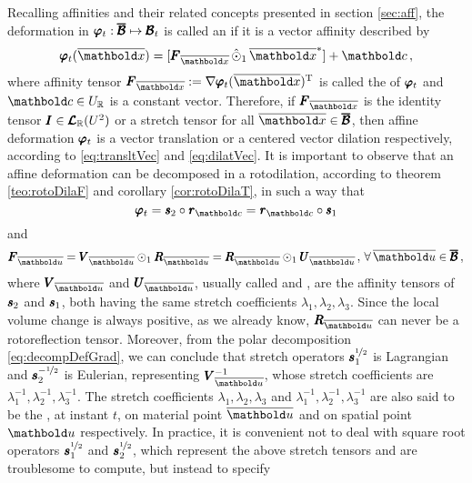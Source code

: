 Recalling affinities and their related concepts presented in section \ref{sec:aff}, the deformation in $\pmb{\varphi}_t : \pmb{\overline{\mathcal{B}}} \mapsto \pmb{\mathcal{B}}_t$ is called an  if it is a vector affinity described by 
\begin{equation}
\fua{\tnr{\varphi}_t}{\overline{\vto{x}}} =[\tnr{F}_{\overline{\vto{x}}}\,\hat{\odot}_1\,\overline{\vto{x}}^*] + \vto{c}\,, 
\end{equation}
where affinity tensor $\tnr{F}_{\overline{\vto{x}}}:=\fua{\nabla\tnr{\varphi}_t}{\overline{\vto{x}}}^\text{T}$ is called the  of $\pmb{\varphi}_t$ and $\vto{c}\in U_\real$ is a constant vector. Therefore, if $\tnr{F}_{\overline{\vto{x}}}$ is the identity tensor $\pmb{I}\in\pmb{\mathcal{L}}_{\mathbb{R}}(U^{2})$ or a stretch tensor for all $\overline{\vto{x}}\in\tnr{\overline{\mathcal{B}}}$, then affine deformation $\pmb{\varphi}_t$ is a vector translation or a centered vector dilation respectively, according to \eqref{eq:transltVec} and \eqref{eq:dilatVec}. It is important to observe that an affine deformation can be decomposed in a rotodilation, according to theorem \ref{teo:rotoDilaF} and corollary \ref{cor:rotoDilaT}, in such a way that 
\begin{equation}\label{eq:decompDefGrad}
\tnr{\varphi}_t = \tnr{\mathit{s}}_2\circ\tnr{\mathit{r}}_{\vto{c}} = \tnr{\mathit{r}}_{\vto{c}}\circ\tnr{\mathit{s}}_1
\end{equation}
and
\begin{equation}
\tnr{F}_{\overline{\vto{u}}}=\tnr{V}_{\overline{\vto{u}}}\odot_1\tnr{R}_{\overline{\vto{u}}}=\tnr{R}_{\overline{\vto{u}}}\odot_1\tnr{U}_{\overline{\vto{u}}}\,,\,\forall\, \overline{\vto{u}}\in\tnr{\overline{\mathcal{B}}}\,, 
\end{equation}
where $\tnr{V}_{\overline{\vto{u}}}$ and $\tnr{U}_{\overline{\vto{u}}}$, usually called  and , are the affinity tensors of $\pmb{\mathit{s}}_2$ and $\pmb{\mathit{s}}_1$, both having the same stretch coefficients $\lambda_1,\lambda_2,\lambda_3$. Since the local volume change is always positive, as we already know, $\tnr{R}_{\overline{\vto{u}}}$ can never be a rotoreflection tensor. Moreover, from the polar decomposition \eqref{eq:decompDefGrad}, we can conclude that stretch operators $\pmb{s}_1^{\nicefrac{1}{2}}$ is Lagrangian and $\pmb{s}_2^{-\nicefrac{1}{2}}$ is Eulerian, representing $\tnr{V}_{\overline{\vto{u}}}^{-1}$, whose stretch coefficients are $\lambda_1^{-1},\lambda_2^{-1},\lambda_3^{-1}$. The stretch coefficients $\lambda_1,\lambda_2,\lambda_3$ and $\lambda_1^{-1},\lambda_2^{-1},\lambda_3^{-1}$ are also said to be the , at instant $t$, on material point $\overline{\vto{u}}$ and on spatial point $\vto{u}$ respectively. In practice, it is convenient not to deal with square root operators $\pmb{s}_1^{\nicefrac{1}{2}}$ and $\pmb{s}_2^{\nicefrac{1}{2}}$, which represent the above stretch tensors and are troublesome to compute, but instead to specify 
